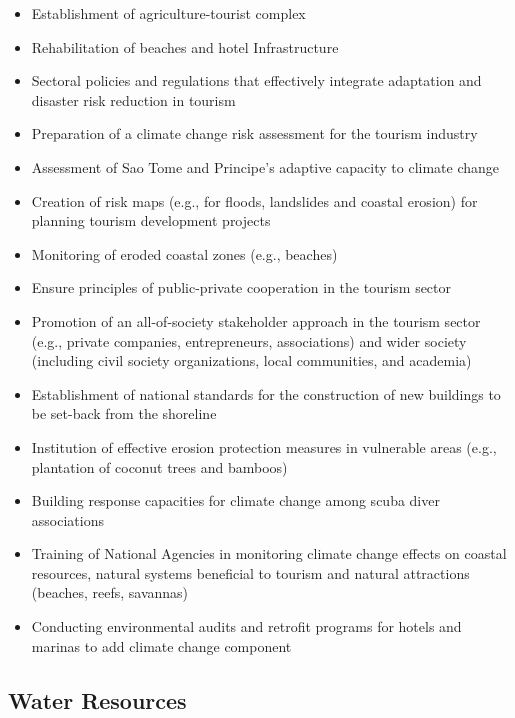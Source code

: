\documentclass[
]{book}
\providecommand{\tightlist}{%
  \setlength{\itemsep}{0pt}\setlength{\parskip}{0pt}}
\begin{document}
\begin{itemize}
\tightlist
\item
  Establishment of agriculture-tourist complex
\item
  Rehabilitation of beaches and hotel Infrastructure
\item
  Sectoral policies and regulations that effectively integrate adaptation and disaster risk reduction in tourism
\item
  Preparation of a climate change risk assessment for the tourism industry
\item
  Assessment of Sao Tome and Principe's adaptive capacity to climate change
\item
  Creation of risk maps (e.g., for floods, landslides and coastal erosion) for planning tourism development projects
\item
  Monitoring of eroded coastal zones (e.g., beaches)
\item
  Ensure principles of public-private cooperation in the tourism sector
\item
  Promotion of an all-of-society stakeholder approach in the tourism sector (e.g., private companies, entrepreneurs, associations) and wider society (including civil society organizations, local communities, and academia)
\item
  Establishment of national standards for the construction of new buildings to be set-back from the shoreline
\item
  Institution of effective erosion protection measures in vulnerable areas (e.g., plantation of coconut trees and bamboos)
\item
  Building response capacities for climate change among scuba diver associations
\item
  Training of National Agencies in monitoring climate change effects on coastal resources, natural systems beneficial to tourism and natural attractions (beaches, reefs, savannas)
\item
  Conducting environmental audits and retrofit programs for hotels and marinas to add climate change component
\end{itemize}

\hypertarget{water-resources}{%
\subsection{Water Resources}\label{water-resources}}
\end{document}
